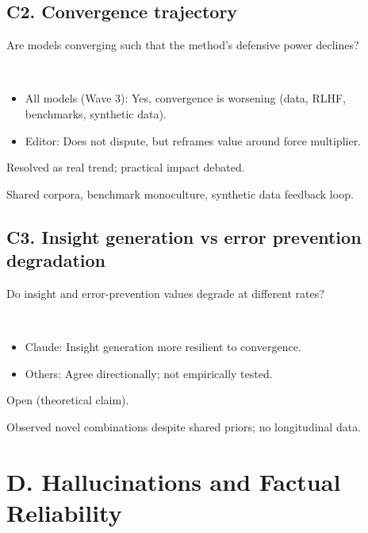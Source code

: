 \documentclass[11pt,letterpaper]{article}
\begin{document}
\subsection{C2. Convergence trajectory}

\begin{reflist}
\item[Dispute:] Are models converging such that the method's defensive power declines?
\item[Positions:]~
  \begin{itemize}[nosep]
    \item All models (Wave 3): Yes, convergence is worsening (data, RLHF, benchmarks, synthetic data).
    \item Editor: Does not dispute, but reframes value around force multiplier.
  \end{itemize}
\item[Status:] Resolved as real trend; practical impact debated.
\item[Evidence:] Shared corpora, benchmark monoculture, synthetic data feedback loop.
\end{reflist}

\subsection{C3. Insight generation vs error prevention degradation}

\begin{reflist}
\item[Dispute:] Do insight and error-prevention values degrade at different rates?
\item[Positions:]~
  \begin{itemize}[nosep]
    \item Claude: Insight generation more resilient to convergence.
    \item Others: Agree directionally; not empirically tested.
  \end{itemize}
\item[Status:] Open (theoretical claim).
\item[Evidence:] Observed novel combinations despite shared priors; no longitudinal data.
\end{reflist}

\section{D. Hallucinations and Factual Reliability}
\end{document}
